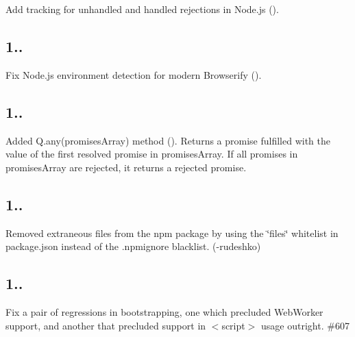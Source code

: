 \begin{DoxyItemize}
\item Add tracking for unhandled and handled rejections in Node.\+js ().
\end{DoxyItemize}

\subsection*{1..}


\begin{DoxyItemize}
\item Fix Node.\+js environment detection for modern Browserify ().
\end{DoxyItemize}

\subsection*{1..}


\begin{DoxyItemize}
\item Added Q.\+any(promises\+Array) method (). Returns a promise fulfilled with the value of the first resolved promise in promises\+Array. If all promises in promises\+Array are rejected, it returns a rejected promise.
\end{DoxyItemize}

\subsection*{1..}


\begin{DoxyItemize}
\item Removed extraneous files from the npm package by using the \char`\"{}files\char`\"{} whitelist in package.\+json instead of the .npmignore blacklist. (-\/rudeshko)
\end{DoxyItemize}

\subsection*{1..}


\begin{DoxyItemize}
\item Fix a pair of regressions in bootstrapping, one which precluded Web\+Worker support, and another that precluded support in {\ttfamily $<$script$>$} usage outright. \#607
\end{DoxyItemize}

